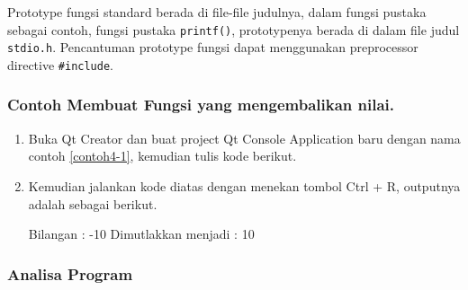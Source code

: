 Prototype fungsi standard berada di file-file judulnya, dalam fungsi
pustaka sebagai contoh, fungsi pustaka \texttt{printf()}, prototypenya
berada di dalam file judul \texttt{stdio.h}. Pencantuman prototype
fungsi dapat menggunakan preprocessor directive \texttt{\#include}.

\subsubsection*{Contoh  Membuat Fungsi yang mengembalikan nilai.}

\begin{enumerate}

\item
  Buka Qt Creator dan buat project Qt Console Application baru dengan
  nama contoh \ref{contoh4-1}, kemudian tulis kode berikut.



\item
  Kemudian jalankan kode diatas dengan menekan tombol Ctrl + R, outputnya
  adalah sebagai berikut.
  \begin{lcverbatim}
Bilangan : -10
Dimutlakkan menjadi : 10
  \end{lcverbatim}
\end{enumerate}

\subsubsection*{Analisa Program }

